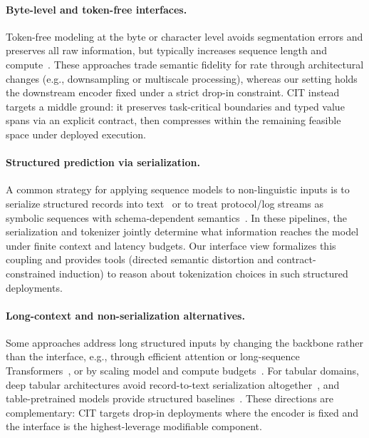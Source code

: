 \paragraph{Byte-level and token-free interfaces.}
Token-free modeling at the byte or character level avoids segmentation errors and preserves all raw information, but typically increases sequence length and compute~\cite{xue2022byt5,clark2022canine,yu2023megabyte}.
These approaches trade semantic fidelity for rate through architectural changes (e.g., downsampling or multiscale processing), whereas our setting holds the downstream encoder fixed under a strict drop-in constraint.
CIT instead targets a middle ground: it preserves task-critical boundaries and typed value spans via an explicit contract, then compresses within the remaining feasible space under deployed execution.

\paragraph{Structured prediction via serialization.}
A common strategy for applying sequence models to non-linguistic inputs is to serialize structured records into text~\cite{yin2020tabert,herzig2020tapas} or to treat protocol/log streams as symbolic sequences with schema-dependent semantics~\cite{he2017drain,du2017deeplog}.
In these pipelines, the serialization and tokenizer jointly determine what information reaches the model under finite context and latency budgets.
Our interface view formalizes this coupling and provides tools (directed semantic distortion and contract-constrained induction) to reason about tokenization choices in such structured deployments.

\paragraph{Long-context and non-serialization alternatives.}
Some approaches address long structured inputs by changing the backbone rather than the interface, e.g., through efficient attention or long-sequence Transformers~\cite{beltagy2020longformer,zaheer2020bigbird,guo2019star}, or by scaling model and compute budgets~\cite{kaplan2020scaling,zhai2022scaling}.
For tabular domains, deep tabular architectures avoid record-to-text serialization altogether~\cite{huang2020tabtransformer,gorishniy2021revisiting}, and table-pretrained models provide structured baselines~\cite{wang2021tuta,deng2022turl}.
These directions are complementary: CIT targets drop-in deployments where the encoder is fixed and the interface is the highest-leverage modifiable component.


